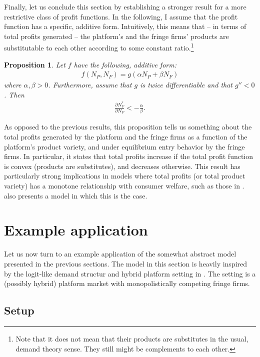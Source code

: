 \documentclass[a4paper]{article}
\newtheorem{proposition}{Proposition}
\begin{document}
Finally, let us conclude this section by establishing a stronger result for a more restrictive class of profit functions.
In the following, I assume that the profit function has a specific, additive form.
Intuitively, this means that -- in terms of total profits generated -- the platform's and the fringe firms' products are substitutable to each other according to some constant ratio.\footnote{
    Note that it does not mean that their products are substitutes in the usual, demand theory sense.
    They still might be complements to each other.
}
\begin{proposition}
    \label{prop:aggregate_size_additive}
    Let $f$ have the following, additive form:
    \begin{align*}
        f(N_P, N_F) = g(\alpha N_P + \beta N_F)
    \end{align*}
    where $\alpha, \beta > 0$.
    Furthermore, assume that $g$ is twice differentiable and that $g'' < 0$.
    Then
    \begin{align*}
        \frac{\partial N_F^*}{\partial N_P} < -\frac{\alpha}{\beta}.
    \end{align*}
\end{proposition}
As opposed to the previous results, this proposition tells us something about the total profits generated by the platform and the fringe firms as a function of the platform's product variety, and under equilibrium entry behavior by the fringe firms.
In particular, it states that total profits increase if the total profit function is convex (products are substitutes), and decreases otherwise.
This result has particularly strong implications in models where total profits (or total product variety) has a monotone relationship with consumer welfare, such as those in \textcite{anderson2020aggregative}.
 also presents a model in which this is the case.


\section{Example application}
\label{sec:example}

Let us now turn to an example application of the somewhat abstract model presented in the previous sections.
The model in this section is heavily inspired by the logit-like demand structur and hybrid platform setting in  \textcite{anderson2021hybrid}.
The setting is a (possibly hybrid) platform market with monopolistically competing fringe firms.

\subsection{Setup}
\end{document}
